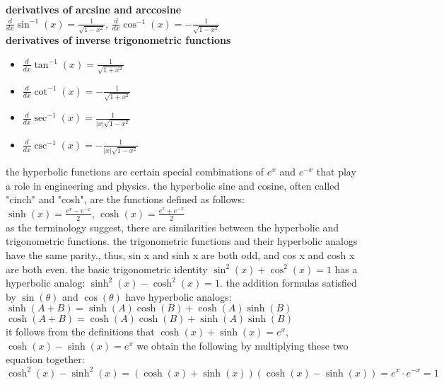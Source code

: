 \documentclass{article}
\begin{document}
\textbf{derivatives of arcsine and arccosine}\\
$\frac{d}{dx}\sin^{-1}(x) = \frac{1}{\sqrt{1 - x^2}}$, $\frac{d}{dx}\cos^{-1}(x) = -\frac{1}{\sqrt{1 - x^2}}$\\  

\textbf{derivatives of inverse trigonometric functions}\\
	\begin{itemize}
		\item $\frac{d}{dx}\tan^{-1}(x) = \frac{1}{\sqrt{1 + x^2}}$ 
		\item $\frac{d}{dx}\cot^{-1}(x) = -\frac{1}{\sqrt{1 + x^2}}$ 
		\item $\frac{d}{dx}\sec^{-1}(x) = \frac{1}{\lvert x\rvert\sqrt{1 - x^2}}$ 
		\item $\frac{d}{dx}\csc^{-1}(x) = -\frac{1}{\lvert x\rvert\sqrt{1 - x^2}}$ 
	\end{itemize}

the hyperbolic functions are certain special combinations of $e^x$ and $e^{-x}$ that play a role in engineering and physics. the hyperbolic sine and cosine, often called "cinch" and "cosh", are the functions defined as follows:\\

$\sinh(x) = \frac{e^x - e^{-x}}{2}$, $\cosh(x) = \frac{e^x + e^{-x}}{2}$\\

as the terminology suggest, there are similarities between the hyperbolic and trigonometric functions. the trigonometric functions and their hyperbolic analogs have the same parity., thus, sin x and sinh x are both odd, and cos x and cosh x are both even. the basic trigonometric identity $\sin^2(x) + \cos^2(x) = 1$ has a hyperbolic analog: $\sinh^2(x) - \cosh^2(x) = 1$. the addition formulas satisfied by $\sin(\theta)$ and $\cos(\theta)$ have hyperbolic analogs:\\

$\sinh(A + B) = \sinh(A)\cosh(B) + \cosh(A)\sinh(B)$\\
$\cosh(A + B) = \cosh(A)\cosh(B) + \sinh(A)\sinh(B)$\\		

it follows from the definitions that $\cosh(x) + \sinh(x) = e^x$, $\cosh(x) - \sinh(x) = e^x$ we obtain the following by multiplying these two equation together:\\ $\cosh^2(x) - \sinh^2(x) = (\cosh(x) + \sinh(x))(\cosh(x) - \sinh(x)) = e^x \cdot e^{-x} = 1$\\
\end{document}
